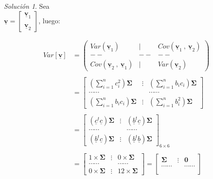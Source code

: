 \documentclass[
]{book}
\theoremstyle{definition}
\theoremstyle{definition}
\theoremstyle{definition}
\theoremstyle{definition}
\theoremstyle{remark}
\newtheorem*{solution}{Solución}
\begin{document}
\begin{solution}
Sea\\
\(\underline{\mathbf{v}}=\begin{bmatrix} \underline{\mathbf{v}}_1 \\ \\ \underline{\mathbf{v}}_2 \end{bmatrix}\), luego:

\begin{align*}
Var [\underline{\mathbf{v}}]&= \begin{pmatrix}
Var(\underline{\mathbf{v}}_1) & | & Cov(\underline{\mathbf{v}}_1\ , \ \underline{\mathbf{v}}_2) \\
-- & -- & -- \\
Cov(\underline{\mathbf{v}}_2\ , \ \underline{\mathbf{v}}_1) & | & Var(\underline{\mathbf{v}}_2)
\end{pmatrix}\\
& \\
&=\begin{bmatrix}
\left( \sum_{i=1}^n c_i^2\right) \mathbf{\Sigma}& \vdots &  \left( \sum_{i=1}^n b_ic_i\right) \mathbf{\Sigma} \\
\cdots\cdots & & \cdots\cdots \\
\left( \sum_{i=1}^n b_ic_i\right) \mathbf{\Sigma} & \vdots & \left( \sum_{i=1}^n b_i^2\right)\mathbf{\Sigma}
\end{bmatrix}\\ 
&\\ 
&=\begin{bmatrix}
\left( \underline{c}^t\underline{c} \right) \mathbf{\Sigma} & \vdots &  \left( \underline{b}^t\underline{c} \right) \mathbf{\Sigma} \\
\cdots\cdots & & \cdots\cdots \\
\left( \underline{b}^t\underline{c} \right) \mathbf{\Sigma} & \vdots & \left( \underline{b}^t\underline{b}\right) \mathbf{\Sigma}
\end{bmatrix}_{6 \times 6}\\
&\\ 
&=\begin{bmatrix}
1 \times \mathbf{\Sigma} & \vdots &  0 \times \mathbf{\Sigma} \\
\cdots\cdots & & \cdots\cdots \\
0\times  \mathbf{\Sigma} & \vdots & 12 \times \mathbf{\Sigma}
\end{bmatrix}=\begin{bmatrix}
\mathbf{\Sigma} & \vdots &  \mathbf{0} \\
\cdots\cdots & & \cdots\cdots \\

\end{bmatrix}
\end{align*}
\end{solution}
\end{document}
